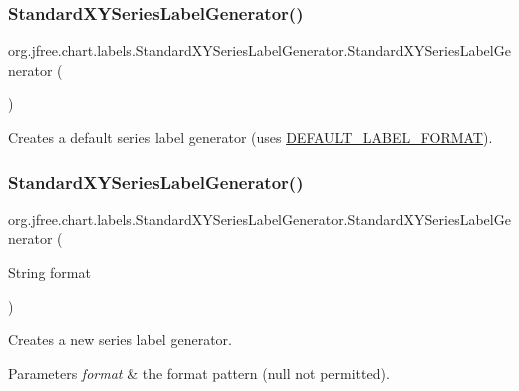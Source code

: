 \subsubsection{\texorpdfstring{Standard\+X\+Y\+Series\+Label\+Generator()}{StandardXYSeriesLabelGenerator()}\hspace{0.1cm}{\footnotesize\ttfamily [1/2]}}
{\footnotesize\ttfamily org.\+jfree.\+chart.\+labels.\+Standard\+X\+Y\+Series\+Label\+Generator.\+Standard\+X\+Y\+Series\+Label\+Generator (\begin{DoxyParamCaption}{ }\end{DoxyParamCaption})}

Creates a default series label generator (uses \mbox{\hyperlink{classorg_1_1jfree_1_1chart_1_1labels_1_1_standard_x_y_series_label_generator_a339616fa3be9aa12a774dd78f1b03343}{D\+E\+F\+A\+U\+L\+T\+\_\+\+L\+A\+B\+E\+L\+\_\+\+F\+O\+R\+M\+AT}}). \mbox{\label{classorg_1_1jfree_1_1chart_1_1labels_1_1_standard_x_y_series_label_generator_a3b65c771b99039d2033254d6f82812a1}} 
\subsubsection{\texorpdfstring{Standard\+X\+Y\+Series\+Label\+Generator()}{StandardXYSeriesLabelGenerator()}\hspace{0.1cm}{\footnotesize\ttfamily [2/2]}}
{\footnotesize\ttfamily org.\+jfree.\+chart.\+labels.\+Standard\+X\+Y\+Series\+Label\+Generator.\+Standard\+X\+Y\+Series\+Label\+Generator (\begin{DoxyParamCaption}\item[{String}]{format }\end{DoxyParamCaption})}

Creates a new series label generator.


\begin{DoxyParams}{Parameters}
{\em format} & the format pattern ({\ttfamily null} not permitted). \\
\hline
\end{DoxyParams}


